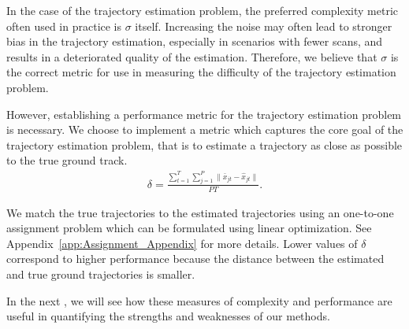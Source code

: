 In the case of the trajectory estimation problem, the preferred complexity metric often used in practice is $\sigma$ itself. Increasing the noise may often lead to stronger bias in the trajectory estimation, especially in scenarios with fewer scans, and results in a deteriorated quality of the estimation. Therefore, we believe that $\sigma$ is the correct metric for use in measuring the difficulty of the trajectory estimation problem. 

However, establishing a performance metric for the trajectory estimation problem is necessary. We choose to implement a metric which captures the core goal of the trajectory estimation problem, that is to estimate a trajectory as close as possible to the true ground track. 
\begin{align*}
	\delta = \frac{\sum\limits_{t=1}^{T}\sum\limits_{j=1}^{P}\| \bar{x}_{jt} - \hat{x}_{jt} \|}{PT}.
\end{align*}

We match the true trajectories to the estimated trajectories using an one-to-one assignment problem which can be formulated using linear optimization. See Appendix~\ref{app:Assignment_Appendix} for more details. Lower values of $\delta$ correspond to higher performance because the distance between the estimated and true ground trajectories is smaller. 

In the next \mytitle, we will see how these measures of complexity and performance are useful in quantifying the strengths and weaknesses of our methods.
